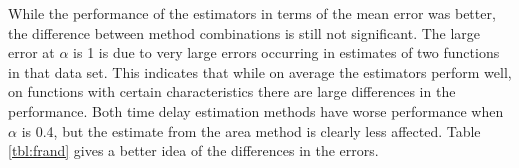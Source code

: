 \documentclass[a4paper,11pt]{article}
\begin{document}
    While the performance of the estimators in terms of the mean error was
    better, the difference between method combinations is still not
    significant. The large error at $\alpha$ is 1 is due to very large errors
    occurring in estimates of two functions in that data set. This indicates
    that while on average the estimators perform well, on functions with certain
    characteristics there are large differences in the performance. Both time
    delay estimation methods have worse performance when $\alpha$ is 0.4, but
    the estimate from the area method is clearly less affected. Table
    \ref{tbl:frand} gives a better idea of the differences in the errors.

    \begin{figure}[h!]
    \\
\end{figure}
\end{document}
